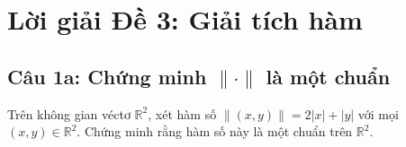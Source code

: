 
\section*{Lời giải Đề 3: Giải tích hàm}

\subsection*{Câu 1a: Chứng minh $\|\cdot\|$ là một chuẩn}

\begin{questionbox}
Trên không gian véctơ $\mathbb{R}^2$, xét hàm số $\|(x, y)\| = 2|x| + |y|$ với mọi $(x, y) \in \mathbb{R}^2$. Chứng minh rằng hàm số này là một chuẩn trên $\mathbb{R}^2$.
\end{questionbox}

